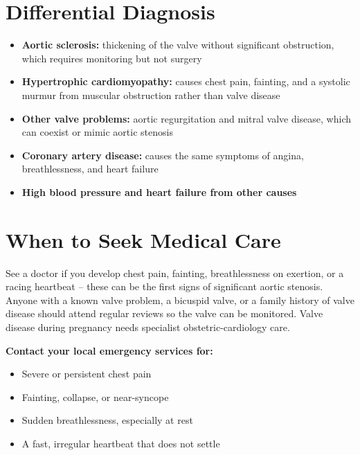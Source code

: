 \section*{Differential Diagnosis}
\begin{itemize}
    \item \textbf{Aortic sclerosis:} thickening of the valve without significant obstruction, which requires monitoring but not surgery
    \item \textbf{Hypertrophic cardiomyopathy:} causes chest pain, fainting, and a systolic murmur from muscular obstruction rather than valve disease
    \item \textbf{Other valve problems:} aortic regurgitation and mitral valve disease, which can coexist or mimic aortic stenosis
    \item \textbf{Coronary artery disease:} causes the same symptoms of angina, breathlessness, and heart failure
    \item \textbf{High blood pressure and heart failure from other causes}
\end{itemize}

\section*{When to Seek Medical Care}
See a doctor if you develop chest pain, fainting, breathlessness on exertion, or a racing heartbeat -- these can be the first signs of significant aortic stenosis. Anyone with a known valve problem, a bicuspid valve, or a family history of valve disease should attend regular reviews so the valve can be monitored. Valve disease during pregnancy needs specialist obstetric-cardiology care.

\textbf{Contact your local emergency services for:}
\begin{itemize}
    \item Severe or persistent chest pain
    \item Fainting, collapse, or near-syncope
    \item Sudden breathlessness, especially at rest
    \item A fast, irregular heartbeat that does not settle
\end{itemize}

